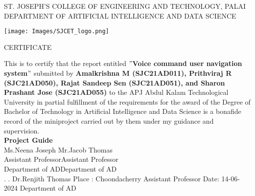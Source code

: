 \newpage
\thispagestyle{empty}
\begin{center}
\normalsize{ST. JOSEPH’S COLLEGE OF ENGINEERING AND TECHNOLOGY, PALAI}\\[0.5cm]
\normalsize
 { DEPARTMENT OF ARTIFICIAL INTELLIGENCE AND DATA SCIENCE}\\[1.0cm]%
   \begin{center}
   \texttt{[image: Images/SJCET\_logo.png]}
   \end{center}
{\large CERTIFICATE}\\[1.5cm]
\end{center}
\normalsize 
This is to certify that the report entitled {\bf $"$Voice command user navigation system$"$} submitted by { \bf Amalkrishna M (SJC21AD011), Prithviraj R (SJC21AD050), Rajat Sandeep Sen (SJC21AD051), and Sharon Prashant Jose (SJC21AD055)} to the APJ Abdul Kalam Technological University in partial fulfillment of the requirements for the award of the Degree of Bachelor of Technology in Artificial Intelligence and Data Science is a bonafide record of the miniproject carried out by them under my guidance and supervision.\vspace{1.2 cm}\\
{\bf Project Guide}\hspace{8.35 cm}{\bf Project Coordinator}\\
Ms.Neena Joseph\hspace{8.0 cm} Mr.Jacob Thomas\\
Assistant Professor\hspace{7.75 cm}Assistant Professor\hspace{2.6 cm}\\Department of AD\hspace{7.8 cm}Department of AD
\vspace{1.0 cm}\\
.\hspace{11.06 cm}{\bf Head of the Department}
\newline
.\hspace{11.01 cm} Dr.Renjith Thomas
\newline
Place : Choondacherry  \hspace{6.87 cm} Assistant Professor
\newline
Date\hspace{0.25 cm}: 14-06-2024 \hspace{7.7 cm} Department of AD
                

